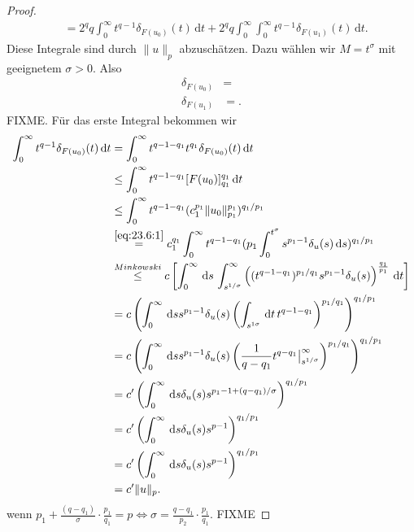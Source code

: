 \documentclass[
paper=a4,
bibtotocnumbered,
liststotocnumbered,
tablecaptionabove,
pointlessnumbers,
twoside,
openright,
10pt
]
{report}
\theoremstyle{definition}
\numberwithin{equation}{chapter}
\begin{document}
\begin{proof}
\begin{align}
&= 2^q q \int_0^\infty t^{q-1} \delta_{F(u_0)}(t)\, \mathrm dt + 2^q q \int_0^\infty \int_0^\infty t^{q-1} \delta_{F(u_1)}(t) \, \mathrm dt.
\end{align}
Diese Integrale sind durch $\| u\|_p$ abzuschätzen. Dazu wählen wir $M= t^\sigma$ mit geeignetem $\sigma>0$. Also
\begin{align}
\delta_{F(u_0)} &= \\
\delta_{F(u_1)} &=.
\end{align}
FIXME. 
Für das erste Integral bekommen wir
\begin{align}
\int_0^\infty t^{q-1} \delta_{F(u_0)} (t) \, \mathrm dt &= \int_0^\infty t^{q-1-q_1} t^{q_1} \delta_{F(u_0)} (t) \, \mathrm dt \\
&\le \int_0^\infty t^{q-1-q_1} [F(u_0)]^{q_1}_{q_1} \, \mathrm dt\\
&\le \int_0^\infty t^{q-1-q_1} (c_1^{p_1} \|u_0\|_{p_1}^{p_1})^{q_1/p_1}\\
&\stackrel{\eqref{eq:23.6:1}}= c_1^{q_1} \int_0^\infty t^{q-1-q_1} (p_1 \int_0^{t^\sigma} s^{p_1-1} \delta_u(s) \, \mathrm ds )^{q_1/p_1}\\
&\stackrel{Minkowski}\le c \left [ \int_0^\infty \, \mathrm ds\, \int_{s^{1/\sigma}}^\infty \left ((t^{q-1-q_1} )^{p_1/q_1} s^{p_1-1} \delta_u(s)\right )^{\frac{q_1}{p_1}} \, \mathrm dt \right ]\\
&= c \left ( \int_0^\infty \, \mathrm ds s^{p_1-1} \delta_u(s) \left ( \int_{s^{1\sigma}} \, \mathrm dt\, t^{q-1-q_1} \right )^{p_1/q_1} \right )^{q_1/p_1}\\
&= c \left ( \int_0^\infty \, \mathrm ds s^{p_1-1} \delta_u(s) \left (\frac{1}{q-q_1} t^{q-q_1} \big |_{s^{1/\sigma}}^\infty \right )^{p_1/q_1}\right )^{q_1/p_1}\\
&= c' \left ( \int_0^\infty \, \mathrm ds \delta_u(s) s^{p_1-1+(q-q_1)/\sigma} \right )^{q_1/p_1}\\
&= c' \left ( \int_0^\infty \, \mathrm ds \delta_u(s) s^{p-1} \right )^{q_1/p_1}\\
&= c' \left ( \int_0^\infty \, \mathrm ds \delta_u(s) s^{p-1} \right )^{q_1/p_1}\\
&= c' \|u\|_p.
\end{align}
wenn $p_1 + \frac{(q-q_1)}{\sigma} \cdot \frac{p_1}{q_1}  = p\iff \sigma=\frac{q-q_1}{p_2} \cdot \frac{p_1}{q_1}$. FIXME


\end{proof}
\end{document}

